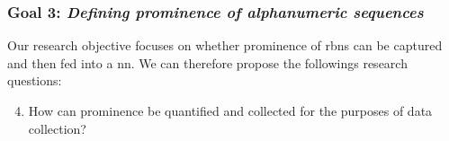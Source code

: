 \subsubsection*{Goal 3: \itshape Defining prominence of alphanumeric sequences}

Our research objective focuses on whether prominence of \glspl{rbn} can be captured and then fed into a \gls{nn}.
We can therefore propose the followings research questions:
\begin{enumerate}[label=\bfseries~RQ\arabic*), leftmargin=2cm, rightmargin=1.5cm]
  \setcounter{enumi}{3}
  \item\label{rq:5} How can prominence be quantified and collected for the purposes of data collection?
\end{enumerate}
